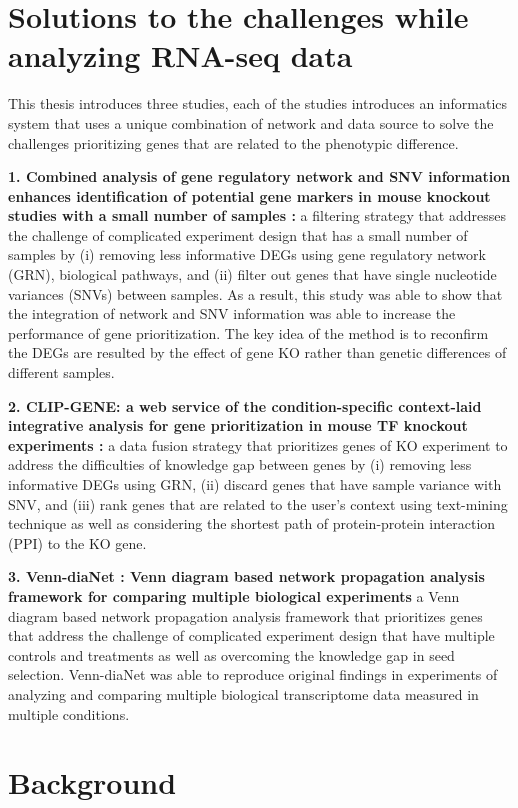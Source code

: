 \documentclass[oneside,phd]{snuthesis}
\begin{document}
\section{Solutions to the challenges while analyzing RNA-seq data}

This thesis introduces three studies, each of the studies introduces an informatics system that uses a unique combination of network and data source to solve the challenges prioritizing genes that are related to the phenotypic difference.

\noindent \textbf{1. Combined analysis of gene regulatory network and SNV information enhances identification of potential gene markers in mouse knockout studies with a small number of samples :} a filtering strategy that addresses the challenge of complicated experiment design that has a small number of samples by
(i) removing less informative DEGs using gene regulatory network (GRN), biological pathways, and (ii) filter out genes that have single nucleotide variances (SNVs) between samples.
As a result, this study was able to show that the integration of network and SNV information was able to increase the performance of gene prioritization. The key idea of the method is to reconfirm the DEGs are resulted by the effect of gene KO rather than genetic differences of different samples.

\noindent \textbf{2. CLIP-GENE: a web service of the condition-specific context-laid integrative analysis for gene prioritization in mouse TF knockout experiments :} a data fusion strategy that prioritizes genes of KO experiment to address the difficulties of knowledge gap between genes by (i) removing less informative DEGs using GRN, (ii) discard genes that have sample variance with SNV, and (iii) rank genes that are related to the user's context using text-mining technique as well as considering the shortest path of protein-protein interaction (PPI) to the KO gene.

\noindent \textbf{3. Venn-diaNet : Venn diagram based network propagation analysis framework for comparing multiple biological experiments} a Venn diagram based network propagation analysis framework that prioritizes genes that address the challenge of complicated experiment design that have multiple controls and treatments as well as overcoming the knowledge gap in seed selection.
Venn-diaNet was able to reproduce original findings in experiments of analyzing and comparing multiple biological transcriptome data measured in multiple conditions. 


\section{Background}
\end{document}
